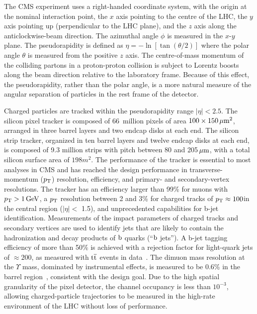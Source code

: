 \documentclass[11pt,twoside,a4paper,cmspaper,final,collab]{cms-tdr}
\begin{document}
The CMS experiment uses a right-handed coordinate system, with the origin at the nominal interaction point,
the $x$ axis pointing to the centre of the LHC, the $y$ axis pointing up (perpendicular to the LHC
plane), and the $z$ axis along the anticlockwise-beam direction.
The azimuthal angle $\phi$ is measured in the $x$-$y$ plane.
The pseudorapidity is defined as $\eta = -\ln[\tan{(\theta/2)}]$
where the polar angle $\theta$ is
measured from the positive $z$ axis.
The centre-of-mass momentum of the colliding partons in a proton-proton collision is subject to Lorentz boosts along the beam direction
relative to the laboratory frame.
Because of this effect, the pseudorapidity, rather than the polar angle, is a
more natural measure of the angular separation of particles in the rest
frame of the detector.

Charged particles are tracked within the pseudorapidity range
$|\eta|<2.5$.
The silicon pixel tracker is composed of 66~million pixels of area
$100\times150\,\mu\text{m}^2$, arranged in three barrel
layers and two endcap disks at each end. The silicon strip tracker, organized in ten barrel
layers and twelve endcap disks at each end, is composed of 9.3 million strips with pitch between 80 and
205$\,\mu\text{m}$, with a total silicon surface area of $198\unit{m}^2$. The performance of the tracker is essential to most
analyses in CMS and has reached the design performance in
transverse-momentum ($p_{\mathrm{T}}$) resolution, efficiency,
and primary- and secondary-vertex resolutions.
The tracker has an efficiency larger than 99\% for muons with
$p_{\mathrm{T}} >1\,\text{Ge\hspace{-.08em}V}$, a $p_{\mathrm{T}}$ resolution
between 2 and 3\% for charged tracks of $p_{\mathrm{T}} \approx 100$\GeV in the
central region ($|\eta| <$ 1.5),
and unprecedented capabilities for b-jet identification.
Measurements of the impact parameters of charged tracks and secondary vertices are used to
identify jets that are likely to contain the hadronization and decay
products of $\mathrm{b}$ quarks (``$\mathrm{b}$ jets'').
A b-jet tagging efficiency of more than 50\% is achieved with a
rejection factor for light-quark jets of ${\approx}200$, as measured with $\mathrm{t}\overline{\mathrm{t}}$ events in data~\cite{CMS-PAS-BTV-12-001}.
The dimuon mass resolution at the $\Upsilon$ mass, dominated by
instrumental effects, is measured to be 0.6\% in the barrel region~\cite{PhysRevD.83.112004}, consistent with the design
goal.
Due to the high spatial granularity of the pixel detector, the channel occupancy is less than $10^{-3}$,
allowing charged-particle trajectories to be measured
in the high-rate environment of the LHC without loss of performance.
\end{document}
